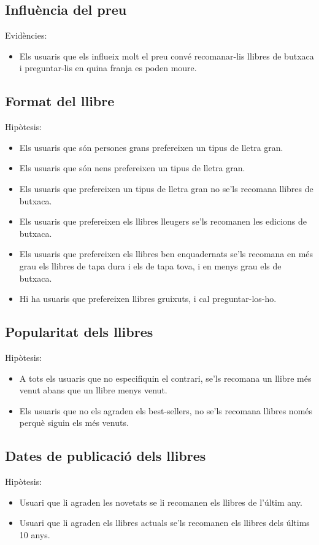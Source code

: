 \subsection{Influència del preu}
Evidències:
\begin{itemize}
  \item Els usuaris que els influeix molt el preu convé recomanar-lis llibres de butxaca i preguntar-lis en quina franja es poden moure.
\end{itemize}

\subsection{Format del llibre}
Hipòtesis:
\begin{itemize}
  \item Els usuaris que són persones grans prefereixen un tipus de lletra gran.
  \item Els usuaris que són nens prefereixen un tipus de lletra gran.
  \item Els usuaris que prefereixen un tipus de lletra gran no se'ls recomana llibres de butxaca.
  \item Els usuaris que prefereixen els llibres lleugers se'ls recomanen les edicions de butxaca.
  \item Els usuaris que prefereixen els llibres ben enquadernats se'ls recomana en més grau els llibres de tapa dura i els de tapa tova, i en menys grau els de butxaca.
  \item Hi ha usuaris que prefereixen llibres gruixuts, i cal preguntar-los-ho.
\end{itemize}

\subsection{Popularitat dels llibres}
Hipòtesis:
\begin{itemize}
  \item A tots els usuaris que no especifiquin el contrari, se'ls recomana un llibre més venut abans que un llibre menys venut.
  \item Els usuaris que no els agraden els best-sellers, no se'ls recomana llibres només perquè siguin els més venuts.
\end{itemize}

\subsection{Dates de publicació dels llibres}
Hipòtesis:
\begin{itemize}
  \item Usuari que li agraden les novetats se li recomanen els llibres de l'últim any.
  \item Usuari que li agraden els llibres actuals se'ls recomanen els llibres dels últims 10 anys.
\end{itemize}


